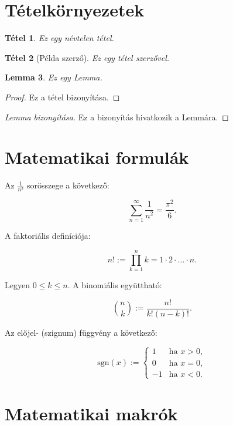 \documentclass{article}
\newtheorem{theorem}{Tétel}
\newtheorem{lemma}[theorem]{Lemma}
\theoremstyle{definition}
\begin{document}
\section{Tételkörnyezetek}

\begin{theorem}
Ez egy névtelen tétel.
\end{theorem}

\begin{theorem}[Példa szerző]
Ez egy tétel szerzővel.
\end{theorem}

\begin{lemma}
Ez egy Lemma.
\end{lemma}

\begin{proof}
Ez a tétel bizonyítása.
\end{proof}

\begin{proof}[Lemma bizonyítása]
Ez a bizonyítás hivatkozik a Lemmára.
\end{proof}

\section{Matematikai formulák}

Az \( \frac{1}{n^2} \) sorösszege a következő:

\[
\sum_{n=1}^{\infty} \frac{1}{n^2} = \frac{\pi^2}{6}.
\]

A faktoriális definíciója:

\[
n! := \prod_{k=1}^{n} k = 1 \cdot 2 \cdot \ldots \cdot n.
\]

Legyen \( 0 \leq k \leq n \). A binomiális együttható:

\[
\binom{n}{k} := \frac{n!}{k!(n-k)!}.
\]

Az előjel- (szignum) függvény a következő:

\[
\text{sgn}(x) := 
\begin{cases} 
1 & \text{ha } x > 0, \\
0 & \text{ha } x = 0, \\
-1 & \text{ha } x < 0.
\end{cases}
\]

\section{Matematikai makrók}
\end{document}
